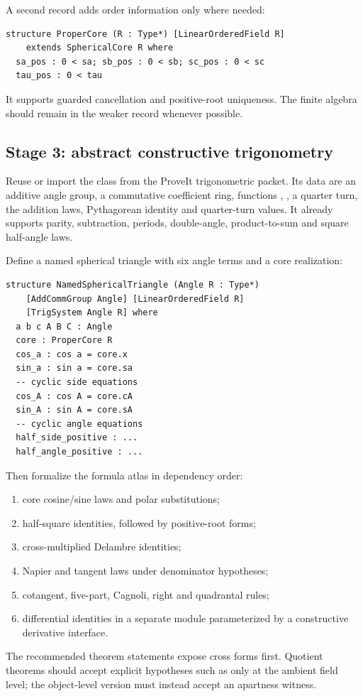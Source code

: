 A second record adds order information only where needed:
\begin{lstlisting}[language={}]
structure ProperCore (R : Type*) [LinearOrderedField R]
    extends SphericalCore R where
  sa_pos : 0 < sa; sb_pos : 0 < sb; sc_pos : 0 < sc
  tau_pos : 0 < tau
\end{lstlisting}
It supports guarded cancellation and positive-root uniqueness.  The finite
algebra should remain in the weaker record whenever possible.

\subsection{Stage 3: abstract constructive trigonometry}

Reuse or import the class  from the ProveIt trigonometric
packet.  Its data are an additive angle group, a commutative coefficient ring,
functions , , a quarter turn, the addition laws,
Pythagorean identity and quarter-turn values.  It already supports parity,
subtraction, periods, double-angle, product-to-sum and square half-angle laws.

Define a named spherical triangle with six angle terms and a core realization:
\begin{lstlisting}[language={}]
structure NamedSphericalTriangle (Angle R : Type*)
    [AddCommGroup Angle] [LinearOrderedField R]
    [TrigSystem Angle R] where
  a b c A B C : Angle
  core : ProperCore R
  cos_a : cos a = core.x
  sin_a : sin a = core.sa
  -- cyclic side equations
  cos_A : cos A = core.cA
  sin_A : sin A = core.sA
  -- cyclic angle equations
  half_side_positive : ...
  half_angle_positive : ...
\end{lstlisting}
Then formalize the formula atlas in dependency order:
\begin{enumerate}
\item core cosine/sine laws and polar substitutions;
\item half-square identities, followed by positive-root forms;
\item cross-multiplied Delambre identities;
\item Napier and tangent laws under denominator hypotheses;
\item cotangent, five-part, Cagnoli, right and quadrantal rules;
\item differential identities in a separate module parameterized by a
constructive derivative interface.
\end{enumerate}
The recommended theorem statements expose cross forms first.  Quotient theorems
should accept explicit hypotheses such as  only at the ambient
field level; the object-level version must instead accept an apartness witness.

